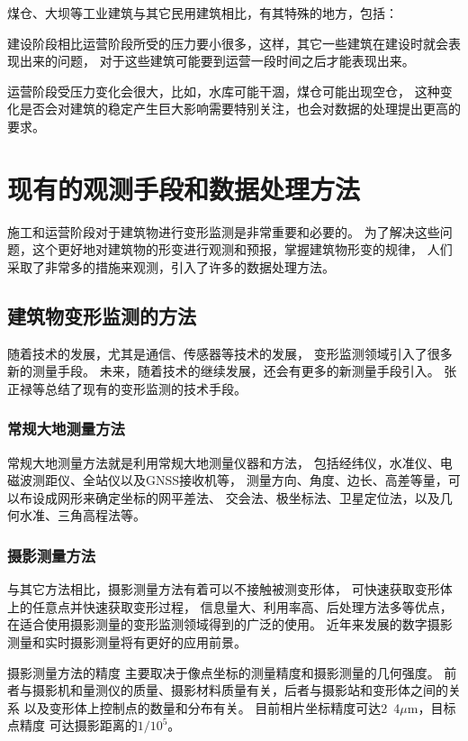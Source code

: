 煤仓、大坝等工业建筑与其它民用建筑相比，有其特殊的地方，包括：
\begin{asparaitem}[$\bullet$]
\item 建设阶段相比运营阶段所受的压力要小很多，这样，其它一些建筑在建设时就会表现出来的问题，
对于这些建筑可能要到运营一段时间之后才能表现出来。
\item 运营阶段受压力变化会很大，比如，水库可能干涸，煤仓可能出现空仓，
这种变化是否会对建筑的稳定产生巨大影响需要特别关注，也会对数据的处理提出更高的要求。
\end{asparaitem}

\section{现有的观测手段和数据处理方法}
施工和运营阶段对于建筑物进行变形监测是非常重要和必要的。
为了解决这些问题，这个更好地对建筑物的形变进行观测和预报，掌握建筑物形变的规律，
人们采取了非常多的措施来观测，引入了许多的数据处理方法。

\subsection{建筑物变形监测的方法}
随着技术的发展，尤其是通信、传感器等技术的发展，
变形监测领域引入了很多新的测量手段。
未来，随着技术的继续发展，还会有更多的新测量手段引入。
张正禄等总结了现有的变形监测的技术手段。
\subsubsection*{常规大地测量方法}
常规大地测量方法就是利用常规大地测量仪器和方法，
包括经纬仪，水准仪、电磁波测距仪、全站仪以及GNSS接收机等，
测量方向、角度、边长、高差等量，可以布设成网形来确定坐标的网平差法、
交会法、极坐标法、卫星定位法，以及几何水准、三角高程法等。
\subsubsection*{摄影测量方法}
与其它方法相比，摄影测量方法有着可以不接触被测变形体，
可快速获取变形体上的任意点并快速获取变形过程，
信息量大、利用率高、后处理方法多等优点，
在适合使用摄影测量的变形监测领域得到的广泛的使用。
近年来发展的数字摄影测量和实时摄影测量将有更好的应用前景。

摄影测量方法的精度
主要取决于像点坐标的测量精度和摄影测量的几何强度。
前者与摄影机和量测仪的质量、摄影材料质量有关，后者与摄影站和变形体之间的关系
以及变形体上控制点的数量和分布有关。
目前相片坐标精度可达2~4${\mu}$m，目标点精度
可达摄影距离的${1/10^5}$。
